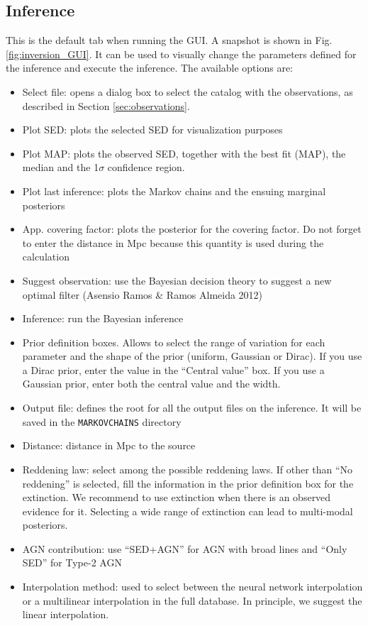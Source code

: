 \documentclass[12pt]{article}
\begin{document}
\subsection{Inference}
This is the default tab when running the GUI. A snapshot is shown in Fig. \ref{fig:inversion_GUI}.
It can be used to visually change the
parameters defined for the inference and execute the inference. The available options are:
\begin{itemize}
\item Select file: opens a dialog box to select the catalog with the observations, as described in Section \ref{sec:observations}.
\item Plot SED: plots the selected SED for visualization purposes
\item Plot MAP: plots the observed SED, together with the best fit (MAP), the median and the 1$\sigma$ confidence region.
\item Plot last inference: plots the Markov chains and the ensuing marginal posteriors
\item App. covering factor: plots the posterior for the covering factor. Do not forget to enter the distance
 in Mpc because this quantity is used during the calculation
\item Suggest observation: use the Bayesian decision theory to suggest a new optimal filter (Asensio Ramos \& Ramos Almeida 2012)
\item Inference: run the Bayesian inference
\item Prior definition boxes. Allows to select the range of variation for each parameter and the shape of the prior (uniform, Gaussian or
Dirac). If you use a Dirac prior, enter the value in the ``Central value'' box. If you use a Gaussian prior, enter both the central
value and the width.
\item Output file: defines the root for all the output files on the inference. It will be saved in the \texttt{MARKOVCHAINS} directory
\item Distance: distance in Mpc to the source
\item Reddening law: select among the possible reddening laws. If other than ``No reddening'' is selected, fill the
information in the prior definition box for the extinction. We recommend to use extinction when there is an observed
evidence for it. Selecting a wide range of extinction can lead to multi-modal posteriors.
\item AGN contribution: use ``SED+AGN'' for AGN with broad lines and ``Only SED'' for Type-2 AGN
\item Interpolation method: used to select between the neural network interpolation or a multilinear
interpolation in the full database. In principle, we suggest the linear interpolation.
\end{itemize}
\end{document}
